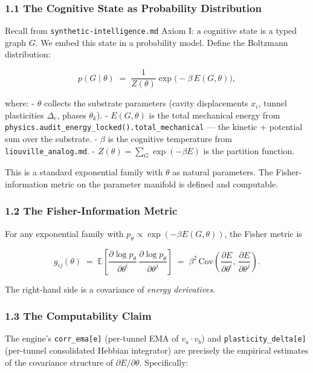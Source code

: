 \documentclass[
  11pt,
  a4paper,
]{article}
\begin{document}
\subsubsection{1.1 The Cognitive State as Probability
Distribution}\label{the-cognitive-state-as-probability-distribution}

Recall from \texttt{synthetic-intelligence.md} Axiom I: a cognitive
state is a typed graph \(G\). We embed this state in a probability
model. Define the Boltzmann distribution:

\[
p(G \mid \theta) \;=\; \frac{1}{Z(\theta)} \exp\!\big(-\beta \, E(G, \theta)\big),
\]

where: - \(\theta\) collects the substrate parameters (cavity
displacements \(x_i\), tunnel plasticities \(\Delta_e\), phases
\(\theta_k\)). - \(E(G, \theta)\) is the total mechanical energy from
\texttt{physics.audit\_energy\_locked().total\_mechanical} --- the
kinetic + potential sum over the substrate. - \(\beta\) is the cognitive
temperature from \texttt{liouville\_analog.md}. -
\(Z(\theta) = \sum_G \exp(-\beta E)\) is the partition function.

This is a standard exponential family with \(\theta\) as natural
parameters. The Fisher-information metric on the parameter manifold is
defined and computable.

\subsubsection{1.2 The Fisher-Information
Metric}\label{the-fisher-information-metric}

For any exponential family with
\(p_\theta \propto \exp(-\beta E(G, \theta))\), the Fisher metric is

\[
g_{ij}(\theta) \;=\; \mathbb{E}\!\left[ \frac{\partial \log p_\theta}{\partial \theta^i} \, \frac{\partial \log p_\theta}{\partial \theta^j} \right]
\;=\; \beta^2 \, \mathrm{Cov}\!\left(\frac{\partial E}{\partial \theta^i}, \, \frac{\partial E}{\partial \theta^j}\right).
\]

The right-hand side is a covariance of \emph{energy derivatives}.

\subsubsection{1.3 The Computability
Claim}\label{the-computability-claim}

The engine's \texttt{corr\_ema{[}e{]}} (per-tunnel EMA of
\(v_a \cdot v_b\)) and \texttt{plasticity\_delta{[}e{]}} (per-tunnel
consolidated Hebbian integrator) are precisely the empirical estimates
of the covariance structure of \(\partial E / \partial \theta\).
Specifically:
\end{document}
